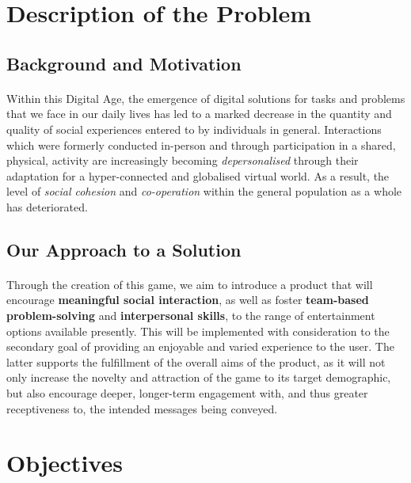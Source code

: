 \documentclass{article}
\begin{document}
\section{Description of the Problem}

\subsection{Background and Motivation}

\paragraph{}Within this Digital Age, the emergence of digital solutions for tasks and problems that we face in our daily lives has led to a marked decrease in the quantity and quality of social experiences entered to by individuals in general. Interactions which were formerly conducted in-person and through participation in a shared, physical, activity are increasingly becoming \emph{depersonalised} through their adaptation for a hyper-connected and globalised virtual world. As a result, the level of \emph{social cohesion} and \emph{co-operation} within the general population as a whole has deteriorated.

\subsection{Our Approach to a Solution}

\paragraph{}Through the creation of this game, we aim to introduce a product that will encourage \textbf{meaningful social interaction}, as well as foster \textbf{team-based problem-solving} and \textbf{interpersonal skills}, to the range of  entertainment options available presently. This will be implemented with consideration to the secondary goal of providing an enjoyable and varied experience to the user. The latter supports the fulfillment of the overall aims of the product, as it will not only increase the novelty and attraction of the game to its target demographic, but also encourage deeper, longer-term engagement with, and thus greater receptiveness to, the intended messages being conveyed.

\section{Objectives}
\end{document}
